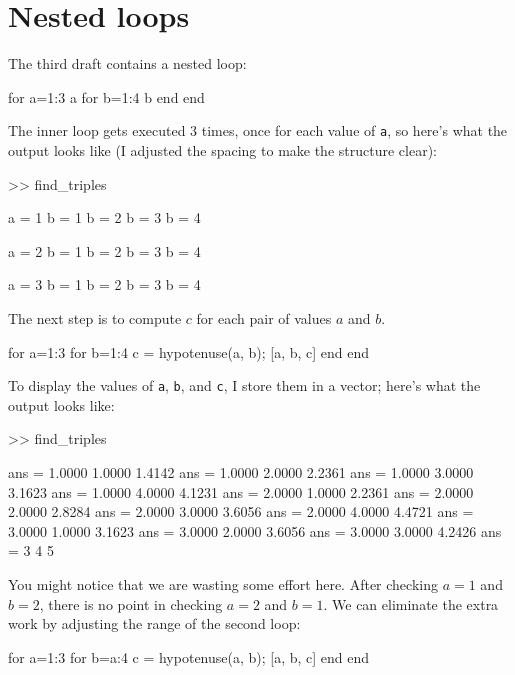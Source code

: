 \documentclass[
]{book}
\numberwithin{Answer}{chapter}
\numberwithin{Exercise}{chapter}
\begin{document}
\section{Nested loops}

The third draft contains a nested loop:

\begin{code}
for a=1:3
    a
    for b=1:4
        b
    end
end
\end{code}

The inner loop gets executed 3 times, once for each value of {\tt a},
so here's what the output looks like (I adjusted the spacing to make
the structure clear):

\begin{code}
>> find_triples

a = 1   b = 1
        b = 2
        b = 3
        b = 4

a = 2   b = 1
        b = 2
        b = 3
        b = 4

a = 3   b = 1
        b = 2
        b = 3
        b = 4
\end{code}

The next step is to compute $c$ for each pair of values $a$ and $b$.

\begin{code}
for a=1:3
    for b=1:4
        c = hypotenuse(a, b);
        [a, b, c]
    end
end
\end{code}

To display the values of {\tt a}, {\tt b}, and {\tt c}, I store them in a vector; here's what the output looks like:

\begin{code}
>> find_triples

ans = 1.0000    1.0000    1.4142
ans = 1.0000    2.0000    2.2361
ans = 1.0000    3.0000    3.1623
ans = 1.0000    4.0000    4.1231
ans = 2.0000    1.0000    2.2361
ans = 2.0000    2.0000    2.8284
ans = 2.0000    3.0000    3.6056
ans = 2.0000    4.0000    4.4721
ans = 3.0000    1.0000    3.1623
ans = 3.0000    2.0000    3.6056
ans = 3.0000    3.0000    4.2426
ans = 3         4         5
\end{code}

You might notice that we are wasting some effort here.
After checking $a=1$ and $b=2$, there is no point in checking
$a=2$ and $b=1$.  We can eliminate the extra work by adjusting the
range of the second loop:

\begin{code}
for a=1:3
    for b=a:4
        c = hypotenuse(a, b);
        [a, b, c]
    end
end
\end{code}
\end{document}
